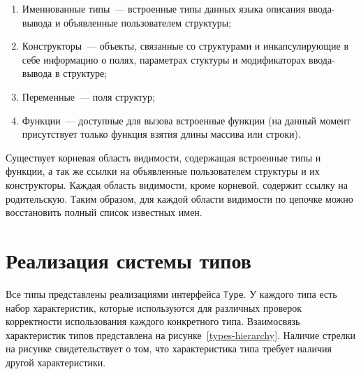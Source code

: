 \documentclass[times,specification,annotation]{style/itmo-student-thesis/itmo-student-thesis}
\begin{document}
\begin{enumerate}
    \item Именнованные типы~--- встроенные типы данных языка описания ввода-вывода и объявленные пользователем структуры;
    \item Конструкторы~--- объекты, связанные со структурами и инкапсулирующие в себе информацию о полях, параметрах стуктуры и модификаторах ввода-вывода в структуре;
    \item Переменные~--- поля структур;
    \item Функции~--- доступные для вызова встроенные функции (на данный момент присутствует только функция взятия длины массива или строки).
\end{enumerate}

Существует корневая область видимости, содержащая встроенные типы и функции, а так же ссылки на объявленные пользователем структуры и их конструкторы. Каждая область видимости, кроме корневой, содержит ссылку на родительскую. Таким образом, для каждой области видимости по цепочке можно восстановить полный список известных имен.

\section{Реализация системы типов}

Все типы представлены реализациями интерфейса \texttt{Type}. У каждого типа есть набор характеристик, которые используются для различных проверок корректности использования каждого конкретного типа. Взаимосвязь характеристик типов представлена на рисунке~\ref{types-hierarchy}. Наличие стрелки на рисунке свидетельствует о том, что характеристика типа требует наличия другой характеристики.
\end{document}
